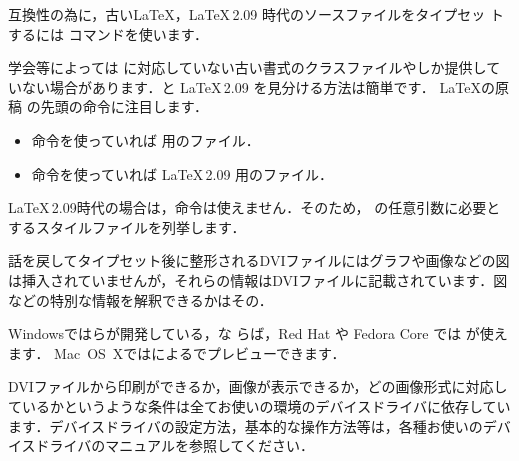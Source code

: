 互換性の為に，古い\LaTeX，\LaTeX\,2.09 時代のソースファイルをタイプセッ
トするには コマンドを使います．

\begin{InTerm}
\end{InTerm}

%
%
学会等によっては\LaTeXe
に対応していない古い書式のクラスファイルやしか提供して
いない場合があります．\LaTeXe と \LaTeX\,2.09 を見分ける方法は簡単です．
\LaTeX の原稿 の先頭の命令に注目します．

\begin{itemize}
 \item {} 命令を使っていれば \LaTeXe 用のファイル．
 \item {} 命令を使っていれば \LaTeX\,2.09 用のファイル．
\end{itemize}

\LaTeX\,2.09時代の場合は，命令は使えません．そのため，
の任意引数に必要とするスタイルファイルを列挙します．

\begin{InTeX}
\end{InTeX}

話を戻してタイプセット後に整形されるDVIファイルにはグラフや画像などの図
は挿入されていませんが，それらの情報はDVIファイルに記載されています．図
などの特別な情報を解釈できるかはその．

%
%
%
%
%
%
Windowsではらが開発している\prog{\Dviout}，な
らば，Red Hat や Fedora Core では が使えます．
Mac~OS~Xではによるでプレビューできます．

DVIファイルから印刷ができるか，画像が表示できるか，どの画像形式に対応し
ているかというような条件は全てお使いの環境のデバイスドライバに依存してい
ます．デバイスドライバの設定方法，基本的な操作方法等は，各種お使いのデバ
イスドライバのマニュアルを参照してください．



